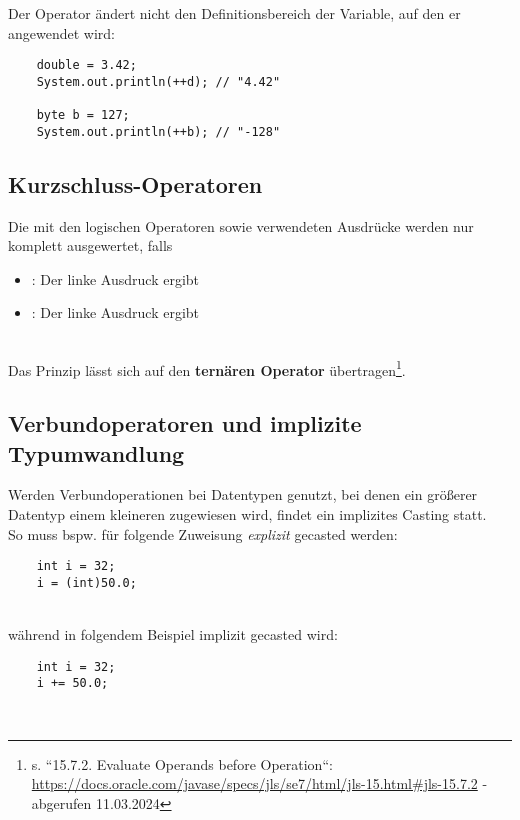 \noindent
Der Operator ändert nicht den Definitionsbereich der Variable, auf den er angewendet wird:

\begin{verbatim}
    double = 3.42;
    System.out.println(++d); // "4.42"

    byte b = 127;
    System.out.println(++b); // "-128"
\end{verbatim}



\subsection{Kurzschluss-Operatoren}
Die mit den logischen Operatoren \code{&&} sowie \code{||} verwendeten Ausdrücke werden nur komplett ausgewertet, falls

\begin{itemize}
    \item \code{&&}: Der linke Ausdruck  ergibt
    \item \code{||}: Der linke Ausdruck  ergibt
\end{itemize}\\

\noindent
Das Prinzip lässt sich auf den \textbf{ternären Operator}  übertragen\footnote{
s. ``15.7.2. Evaluate Operands before Operation``: \url{https://docs.oracle.com/javase/specs/jls/se7/html/jls-15.html#jls-15.7.2} - abgerufen 11.03.2024
}.


\subsection{Verbundoperatoren und implizite Typumwandlung}

Werden Verbundoperationen bei Datentypen genutzt, bei denen ein größerer Datentyp einem kleineren zugewiesen wird, findet ein implizites Casting statt.\\

\noindent
So muss bspw. für folgende Zuweisung \textit{explizit} gecasted werden:

\begin{verbatim}
    int i = 32;
    i = (int)50.0;
\end{verbatim}\\

während in folgendem Beispiel implizit gecasted wird:

\begin{verbatim}
    int i = 32;
    i += 50.0;
\end{verbatim}\\
